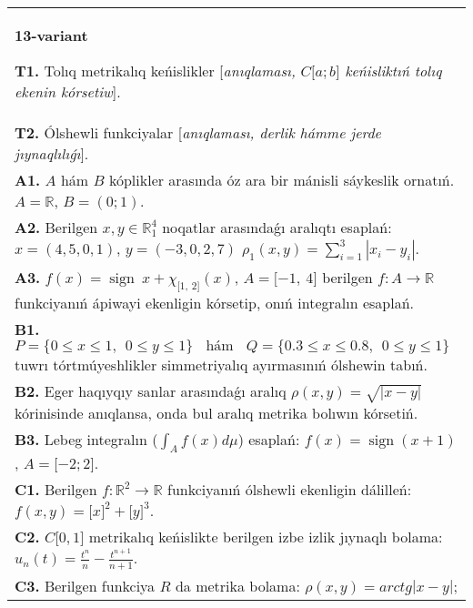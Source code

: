 \documentclass{article}
\DeclareMathOperator{\sign}{sign}
\begin{document}
\begin{tabular}{m{17cm}}
\textbf{13-variant}
\newline

\textbf{T1.} Tolıq metrikalıq keńislikler [\textit{anıqlaması, \(C\lbrack a;b\rbrack\) keńisliktıń tolıq ekenin kórsetiw}]. \\
\textbf{T2.} Ólshewli funkciyalar [\textit{anıqlaması, derlik hámme jerde jıynaqlılıǵı}]. \\
\textbf{A1.} \(A\) hám \(B\) kóplikler arasında óz ara bir mánisli sáykeslik ornatıń. \(A\mathbb{= R}\), \(B = (0;1)\). \\
\textbf{A2.} Berilgen \(x,y \in \mathbb{R}_1^{4}\) noqatlar arasındaǵı aralıqtı esaplań: \(x = (4,5,0,1)\), \(y = ( - 3,0,2,7)\) \(\rho_{1}(x,y) = \sum_{i = 1}^{3}\left| x_{i} - y_{i} \right|\). \\
\textbf{A3.} \(f(x) = \sign \ x + \chi_{\lbrack 1,\ 2\rbrack}(x)\), \(A = \lbrack - 1,\ 4\rbrack\) berilgen \(f:A\rightarrow\mathbb{R}\) funkciyanıń ápiwayi ekenligin kórsetip, onıń integralın esaplań. \\
\textbf{B1.} \(P = \{ 0 \leq x \leq 1,\ \ 0 \leq y \leq 1\}\ \ \ \ \text{hám}\ \ \ \ Q = \{ 0.3 \leq x \leq 0.8,\ \ 0 \leq y \leq 1\}\) tuwrı tórtmúyeshlikler simmetriyalıq ayırmasınıń ólshewin tabıń. \\
\textbf{B2.} Eger haqıyqıy sanlar arasındaǵı aralıq \(\rho(x,y) = \sqrt{|x - y|}\) kórinisinde anıqlansa, onda bul aralıq metrika bolıwın kórsetiń. \\
\textbf{B3.} Lebeg integralın (\(\int_{A}^{}{f(x)d\mu}\)) esaplań: \(f(x) = \sign(x + 1)\), \(A = \lbrack - 2;2\rbrack\). \\
\textbf{C1.} Berilgen \(f:\mathbb{R}^{2}\mathbb{\rightarrow R}\) funkciyanıń ólshewli ekenligin dálilleń: \(f(x,y) = \lbrack x\rbrack^{2} + \lbrack y\rbrack^{3}\). \\
\textbf{C2.} \(C\lbrack 0,1\rbrack\) metrikalıq keńislikte berilgen izbe izlik jıynaqlı bolama: \(u_{n}(t) = \frac{t^{n}}{n} - \frac{t^{n + 1}}{n + 1}\). \\
\textbf{C3.} Berilgen funkciya \(R\) da metrika bolama: \(\rho(x,y) = arctg|x - y|\); \\

\end{tabular}
\vspace{1cm}
\end{document}
